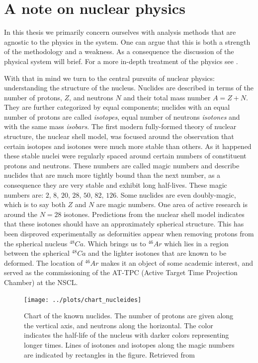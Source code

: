 

\section{A note on nuclear physics}

In this thesis we primarily concern ourselves with analysis methods that are agnostic to the physics in the system. One can argue that this is both a strength of the methodology and a weakness. As a consequence the discussion of the physical system will brief. For a more in-depth treatment of the physics  see \cite{Bradt2017}. 

With that in mind we turn to the central pursuits of nuclear physics: understanding the structure of the nucleus. Nuclides are described in terms of the number of protons, $Z$, and neutrons $N$ and their total mass number $A = Z +N$. They are further categorized by equal components; nuclides with an equal number of protons are called \textit{isotopes}, equal number of neutrons \textit{isotones} and with the same  mass \textit{isobars}. The first modern fully-formed theory of nuclear structure, the nuclear shell model, was focused around the observation that certain isotopes and isotones were much more stable than others. As it happened these stable nuclei were regularly spaced around certain numbers of constituent protons and neutrons. These numbers are called magic numbers and describe nuclides that are much more tightly bound than the next number, as a consequence they are very stable and exhibit long half-lives. These magic numbers are: $2 ,\, 8 ,\, 20 ,\, 28 ,\, 50 ,\, 82 ,\, 126$. Some nuclides are even doubly-magic, which is to say both $Z$ and $N$ are magic numbers. One area of active research is around the $N=28$ isotones. Predictions from the nuclear shell model indicates that these isotones should have an approximately spherical structure. This has been disproved experimentally as deformities appear when removing protons from the spherical nucleus ${}^{48}Ca$. Which brings us to ${}^{46}Ar$ which lies in a region between the spherical ${}^{48}Ca$ and the lighter isotones that are known to be deformed. The location of ${}^{46}Ar$ makes it an object of some academic interest, and served as the commissioning of the AT-TPC (Active Target Time Projection Chamber) at the NSCL. 


\begin{figure}
\centering
\texttt{[image: ../plots/chart\_nucleides]}
\caption[Chart of the nuclides]{Chart of the known nuclides. The number of protons are given along the vertical axis, and neutrons along the horizontal. The color indicates the half-life of the nucleus with darker colors representing longer times. Lines of isotones and isotopes along the magic numbers are indicated by rectangles in the figure. Retrieved from \cite{Sonzogni2019}}
\end{figure}


